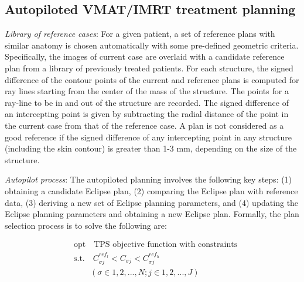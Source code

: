 \subsection{Autopiloted VMAT/IMRT treatment planning}
\textit{Library of reference cases}: For a given patient, a set of reference plans with similar anatomy is chosen automatically with some pre-defined geometric criteria. Specifically, the images of current case are overlaid with a candidate reference plan from a library of previously treated patients. For each structure, the signed difference of the contour points of the current and reference plans is computed for ray lines starting from the center of the mass of the structure\cite{schreibmann2005}. The points for a ray-line to be in and out of the structure are recorded. The signed difference of an intercepting point is given by subtracting the radial distance of the point in the current case from that of the reference case. A plan is not considered as a good reference if the signed difference of any intercepting point in any structure (including the skin contour) is greater than 1-3 mm, depending on the size of the structure. 

\textit{Autopilot process}: The autopiloted planning involves the following key steps: (1) obtaining a candidate Eclipse plan, (2) comparing the Eclipse plan with reference data, (3) deriving a new set of Eclipse planning parameters, and (4) updating the Eclipse planning parameters and obtaining a new Eclipse plan. Formally, the plan selection process is to solve the following are: 

 \begin{align}\label{eq:eq4.1}
& \text{opt} \quad \text{TPS objective function with constraints} \nonumber\\
& \text{s.t.} \quad C^{ref_{l}}_{\sigma j} < C_{\sigma j} < C^{ref_{h}}_{\sigma j} \\
& \quad \quad (\sigma \in 1,2,...,N; j \in 1,2,...,J) \nonumber
\end{align}

